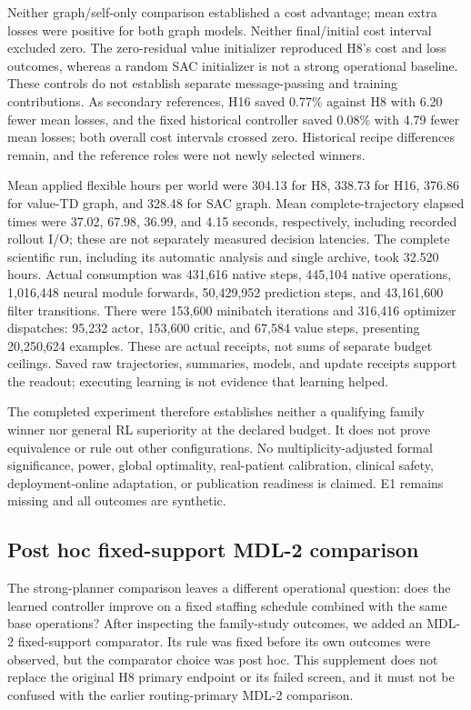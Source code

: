 \documentclass[preprint,review,12pt]{elsarticle}
\begin{document}
Neither graph/self-only comparison established a cost advantage; mean extra
losses were positive for both graph models. Neither final/initial cost
interval excluded zero. The zero-residual value initializer reproduced H8's
cost and loss outcomes, whereas a random SAC initializer is not a strong
operational baseline. These controls do not establish separate message-passing
and training contributions. As secondary references, H16 saved 0.77\%
against H8 with 6.20 fewer mean losses, and the fixed historical controller
saved 0.08\% with 4.79 fewer mean losses; both overall cost intervals crossed
zero. Historical recipe differences remain, and the reference roles were
not newly selected winners.

Mean applied flexible hours per world were 304.13 for H8, 338.73 for H16,
376.86 for value-TD graph, and 328.48 for SAC graph. Mean complete-trajectory
elapsed times were 37.02, 67.98, 36.99, and 4.15 seconds, respectively,
including recorded rollout I/O; these are not separately measured decision
latencies. The complete scientific run, including its automatic analysis and
single archive, took 32.520 hours. Actual consumption was 431,616 native
steps, 445,104 native operations, 1,016,448 neural module forwards,
50,429,952 prediction steps, and 43,161,600 filter transitions.
There were 153,600 minibatch iterations and 316,416 optimizer dispatches:
95,232 actor, 153,600 critic, and 67,584 value steps, presenting
20,250,624 examples. These are actual receipts, not sums of separate budget
ceilings. Saved raw trajectories, summaries, models, and update receipts
support the readout; executing learning is not evidence that learning helped.

The completed experiment therefore establishes neither a qualifying family
winner nor general RL superiority at the declared budget. It does not prove
equivalence or rule out other configurations. No multiplicity-adjusted formal
significance, power, global optimality, real-patient calibration, clinical
safety, deployment-online adaptation, or publication readiness is claimed.
E1 remains missing and all outcomes are synthetic.

\subsection{Post hoc fixed-support MDL-2 comparison}
\label{sec:mdl2-fixed-supplement}
The strong-planner comparison leaves a different operational question:
does the learned controller improve on a fixed staffing schedule combined
with the same base operations? After inspecting the family-study outcomes,
we added an MDL-2 fixed-support comparator. Its rule was fixed before its
own outcomes were observed, but the comparator choice was post hoc. This
supplement does not replace the original H8 primary endpoint or its failed
screen, and it must not be confused with the earlier routing-primary MDL-2
comparison.
\end{document}
